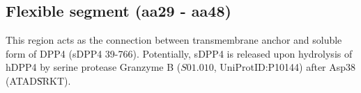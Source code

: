 \subsection{Flexible segment (aa29 - aa48)}

This region acts as the connection between transmembrane anchor and soluble form of DPP4 (sDPP4 39-766). Potentially, sDPP4 is released upon hydrolysis of hDPP4 by serine protease Granzyme B ($S01.010$, UniProtID:P10144) after Asp38 (ATAD\|SRKT).~\cite{Song_2018} 
